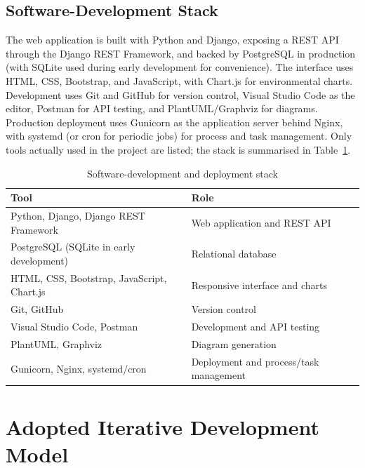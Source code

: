 \documentclass[12pt,a4paper]{report}
\begin{document}
\subsection{Software-Development Stack}

The web application is built with Python and Django, exposing a REST API through the Django REST Framework, and backed by PostgreSQL in production (with SQLite used during early development for convenience). The interface uses HTML, CSS, Bootstrap, and JavaScript, with Chart.js for environmental charts. Development uses Git and GitHub for version control, Visual Studio Code as the editor, Postman for API testing, and PlantUML/Graphviz for diagrams. Production deployment uses Gunicorn as the application server behind Nginx, with systemd (or cron for periodic jobs) for process and task management. Only tools actually used in the project are listed; the stack is summarised in Table~\ref{tab:software}.

\begin{table}[tbp]
\caption{Software-development and deployment stack}
\label{tab:software}
\centering
\small
\begin{tabularx}{\textwidth}{|l|X|}
\hline
\rowcolor{headerblue}
\textbf{Tool} & \textbf{Role} \\
\hline
Python, Django, Django REST Framework & Web application and REST API \\
\hline
PostgreSQL (SQLite in early development) & Relational database \\
\hline
HTML, CSS, Bootstrap, JavaScript, Chart.js & Responsive interface and charts \\
\hline
Git, GitHub & Version control \\
\hline
Visual Studio Code, Postman & Development and API testing \\
\hline
PlantUML, Graphviz & Diagram generation \\
\hline
Gunicorn, Nginx, systemd/cron & Deployment and process/task management \\
\hline
\end{tabularx}
\end{table}

\section{Adopted Iterative Development Model}
\end{document}
